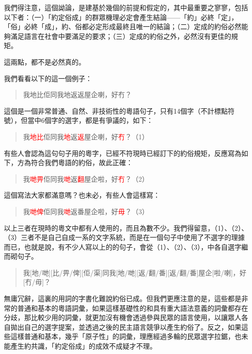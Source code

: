 \documentclass[a5paper, 12pt, openany]{book} %
\begin{document}
我們得注意，這個詏論，是建基於幾個的前提和假定的，其中最重要之寥寥，包括以下者：（一）「約定俗成」的群眾機理必定會產生結論——「約」必終「定」，「俗」必終「成」，約、俗都必定形成最終且唯一的結論；（二）定成的約俗必然能夠滿足語言在社會中要滿足的要求；（三）定成的約俗之外，必然沒有更佳的規矩。

這兩點，都不是必然真的。

我們看看以下的這一個例子：

\begin{quotation}
\centering
我地比佢同我地返返屋企喇，好冇？
\end{quotation}

這個是一個非常普通、自然、非技術性的粵語句子，只有14個字（不計標點符號），但當中6個字的選字，都是有爭議的，如下：
\begin{quotation}
\centering
我\textcolor{red}{地比}佢同我\textcolor{red}{地}返\textcolor{red}{返}屋企喇，好\textcolor{red}{冇}？（1）
\end{quotation}

有些人會認為這句句子用的粵字，已經不符現時已經訂下的約俗規矩，反應寫為如下，方為符合我們粵語的約俗，故此正確：

\begin{quotation}

\centering
我\textcolor{red}{哋畀}佢同我\textcolor{red}{哋}返\textcolor{red}{翻}屋企啦，好\textcolor{red}{冇}？（2）
\end{quotation}

這個寫法大家都滿意嗎？也未必，有些人會這樣寫：

\begin{quotation}
\centering
我\textcolor{red}{哋俾}佢同我\textcolor{red}{哋}返番屋企啦，好\textcolor{red}{毋}？（3）  
\end{quotation}


以上三者在現時的粵文中都有人使用的，而且為數不少。我們得留意，（1）、（2）、（3）三者不是自己自成一系的文字系統，而是在一個句子中使用了不選字的理據而已，也就是說，有不少人寫以上的的句子，會從（1）、（2）、（3），中各自選字繼而砌句子。

\begin{quotation}
\centering
我[地/哋][比/畀/俾][佢/渠]同我[地/哋][返/翻/番][返/翻/番]屋企[啦/喇]，好[冇/毋]？
\end{quotation}

無庸冗辭，這裏的用詞的字書化難說約俗已成。但我們更應注意的是，這些都是非常的普通和基本的粵語詞彙，如果這樣基礎性的和具有重大語法意義的詞彙都存在分歧，那比較少用的詞彙，就更加沒有機會透過參與民眾的語言使用，以讓眾人各自拋出自己的選字提案，並透過之後的民主語言競爭以產生約俗了。反之，如果這些這樣普通和基本，幾乎「原子性」的詞彙，理應經過多輪的民眾選字拉鋸，也未能產生約共識，「約定俗成」的成效不成疑才不理。
\end{document}
